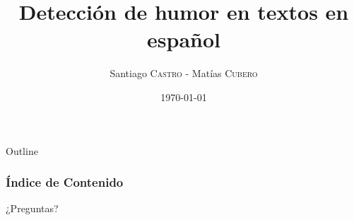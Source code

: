 \documentclass{beamer}
\title[Detección de humor]{Detección de humor en textos en español} %
\author{Santiago \textsc{Castro} - Matías \textsc{Cubero}} %
\institute[] %
{
Facultad de Ingeniería - Universidad de la República \\ %
\medskip
\textit{sacastro@fing.edu.uy - mcubero@fing.edu.uy} %
}
\date{\today} %
\begin{document}
\begin{frame}
\titlepage %
\end{frame}

\begin{frame}[shrink]{Outline}
\frametitle{Índice de Contenido}
\begin{multicols}{2}
	\tableofcontents
\end{multicols}
\end{frame}









\begin{frame}
\Huge{\centerline{¿Preguntas?}}
\end{frame}
\end{document}
